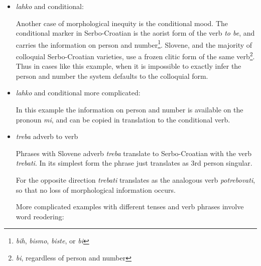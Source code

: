 \begin{itemize}
\item \emph{lahko} and conditional:

Another case of morphological inequity is the conditional
mood. The conditional marker in Serbo-Croatian is the aorist form of the verb
\emph{to be}, and carries the information on person and
number\footnote{\emph{bih}, \emph{bismo}, \emph{biste}, or \emph{bi}}. Slovene, and the majority of colloquial Serbo-Croatian varieties, use
a frozen clitic form of the same verb\footnote{\emph{bi}, regardless of person and
number}. Thus in cases like this example, when it is impossible to
exactly infer the person and number the system defaults to the
colloquial form.

\item \emph{lahko} and conditional more complicated:

In this example the information on person and number is available
on the pronoun \emph{mi}, and can be copied in translation to the
conditional verb.

\item \emph{treba} adverb to verb

Phrases with Slovene adverb \emph{treba} translate to Serbo-Croatian with the
verb \emph{trebati}. In its simplest form the phrase just translates
as 3rd person singular.

For the opposite direction \emph{trebati} translates as the analogous
verb \emph{potrebovati}, so that no loss of morphological information occurs.


More complicated examples with different tenses and verb phrases involve word reodering:


\end{itemize}
